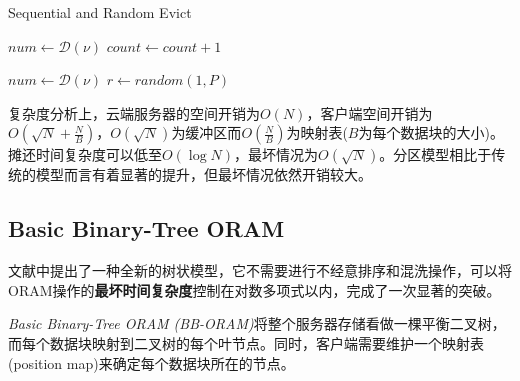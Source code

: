 \begin{algorithm}[H]
    \caption{Sequential and Random Evict}
    \begin{minipage}{0.5\textwidth}
        \begin{algorithmic}[1]
                \State $num \gets \mathcal{D}(\nu)$
                    \State $count \gets count+1$
                    \State{}
                \EndFor
            \EndProcedure
        \end{algorithmic}
    \end{minipage}
    \begin{minipage}{0.5\textwidth}
        \begin{algorithmic}[1]
                \State $num \gets \mathcal{D}(\nu)$
                    \State $r \gets random(1,P)$
                    \State{}
                \EndFor
            \EndProcedure
        \end{algorithmic}
    \end{minipage}
\end{algorithm}
复杂度分析上，云端服务器的空间开销为$O(N)$，客户端空间开销为$O(\sqrt{N}+\frac{N}{B})$，$O(\sqrt{N})$为缓冲区而$O(\frac{N}{B})$为映射表($B$为每个数据块的大小)。摊还时间复杂度可以低至$O(\log N)$，最坏情况为$O(\sqrt{N})$。分区模型相比于传统的模型而言有着显著的提升，但最坏情况依然开销较大。

\subsection{Basic Binary-Tree ORAM}
文献\cite{ref8}中提出了一种全新的树状模型，它不需要进行不经意排序和混洗操作，可以将ORAM操作的\textbf{最坏时间复杂度}控制在对数多项式以内，完成了一次显著的突破。\par
\textit{Basic Binary-Tree ORAM (BB-ORAM)}将整个服务器存储看做一棵平衡二叉树，而每个数据块映射到二叉树的每个叶节点。同时，客户端需要维护一个映射表(position map)来确定每个数据块所在的节点。

